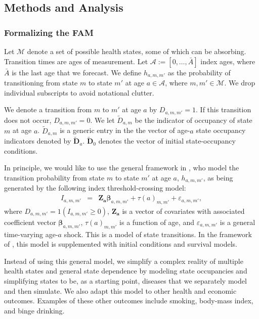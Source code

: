 \subsection{Methods and Analysis}

\subsubsection{Formalizing the FAM}
\label{section:transition_models}

Let $\mathcal{M}$ denote a set of possible health states, some of which can be absorbing. Transition times are ages of measurement. Let $\mathcal{A}:= [ 0, \ldots, \bar{A}]$ index ages, where $\bar{A}$ is the last age that we forecast. We define $h_{a,m,m'}$ as the probability of transitioning from state $m$ to state $m'$ at age $a \in \mathcal{A}$, where $m, m' \in \mathcal{M}$. We drop individual subscripts to avoid notational clutter.

We denote a transition from $m$ to $m'$ at age $a$ by $D_{a,m,m'} = 1$. If this transition does not occur,  $D_{a,m,m'} = 0$. We let $\tilde{D}_{a,m}$ be the indicator of occupancy of state $m$ at age $a$. $\tilde{D}_{a,m}$ is a generic entry in the the vector of age-$a$ state occupancy indicators denoted by $\tilde{\bm{D}}_a$. $\tilde{\bm{D}}_0$ denotes the vector of initial state-occupancy conditions.

In principle, we would like to use the general framework in \citet{Heckman_1981_heterogeneity,Heckman_1981_IncidentalParametersProblem}, who model the transition probability from state $m$ to state $m'$ at age $a$, $h_{a,m,m'}$, as being generated by the following index threshold-crossing model:
\begin{eqnarray}
I_{a,m,m'} &=& \bm{Z_a} \bm{\beta}_{a,m,m'} + \tau \left( a \right)_{m,m'} + \varepsilon_{a,m,m'}, \label{eq:trans0}
\end{eqnarray}
where $D_{a,m,m'} = \bm{\mathit{1}}  \left( I_{a,m,m'} \geq 0 \right)$, $\bm{Z_a}$ is a vector of covariates with associated coefficient vector $ \bm{\beta}_{a,m,m'}$, $\tau \left( a \right)_{m,m'}$ is a function of age, and $\varepsilon_{a,m,m'}$ is a general time-varying age-$a$ shock. This is a model of state transitions. In the framework of  \citet{Heckman_1981_heterogeneity,Heckman_1981_IncidentalParametersProblem}, this model is supplemented with initial conditions and survival models.

Instead of using this general model, we simplify a complex reality of multiple health states and general state dependence by modeling state occupancies and simplifying states to be, as a starting point, diseases that we separately model and then simulate. We also adapt this model to other health and economic outcomes. Examples of these other outcomes include smoking, body-mass index, and binge drinking.

